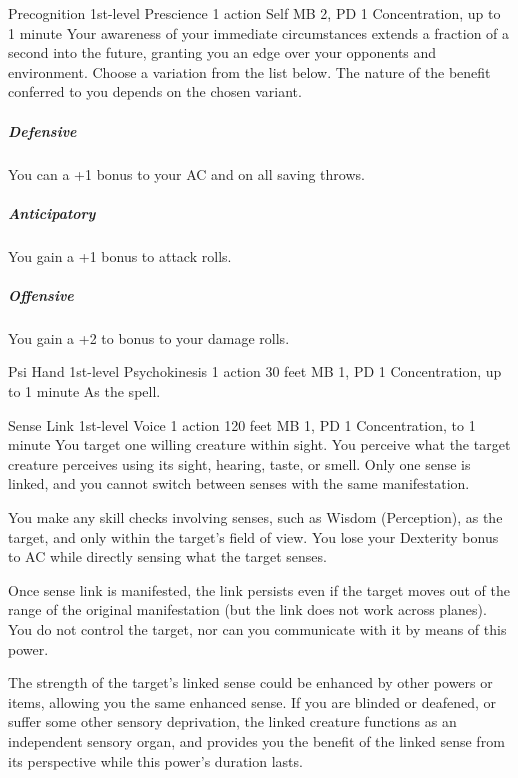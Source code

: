 \DndPowerHeader%
  {Precognition}
  {1st-level Prescience}
  {1 action}
  {Self}
  {MB 2, PD 1}
  {Concentration, up to 1 minute}
Your awareness of your immediate circumstances extends
a fraction of a second into the future,
granting you an edge over your opponents and environment.
Choose a variation from the list below.
The nature of the benefit conferred to you
depends on the chosen variant.
\subparagraph{Defensive}
  You can a +1 bonus to your AC and on all saving throws.
\subparagraph{Anticipatory}
  You gain a +1 bonus to attack rolls.
\subparagraph{Offensive}
  You gain a +2 to bonus to your damage rolls.

\DndPowerHeader%
  {Psi Hand}
  {1st-level Psychokinesis}
  {1 action}
  {30 feet}
  {MB 1, PD 1}
  {Concentration, up to 1 minute}
As the  spell.

\DndPowerHeader%
  {Sense Link}
  {1st-level Voice}
  {1 action}
  {120 feet}
  {MB 1, PD 1}
  {Concentration, to 1 minute}
  You target one willing creature within sight.
  You perceive what the target creature perceives using its sight,
  hearing, taste, or smell.
  Only one sense is linked,
  and you cannot switch between senses with the same manifestation.

  You make any skill checks involving senses,
  such as Wisdom (Perception), as the target,
  and only within the target's field of view.
  You lose your Dexterity bonus to AC while
  directly sensing what the target senses.
  
  Once sense link is manifested, the link persists
  even if the target moves out of the range
  of the original manifestation
  (but the link does not work across planes).
  You do not control the target,
  nor can you communicate with it by means of this power.
  
  The strength of the target's linked sense could be enhanced
  by other powers or items,
  allowing you the same enhanced sense.
  If you are blinded or deafened, or suffer some other sensory deprivation,
  the linked creature functions as an independent sensory organ,
  and provides you the benefit of the linked sense from its perspective
  while this power's duration lasts.


